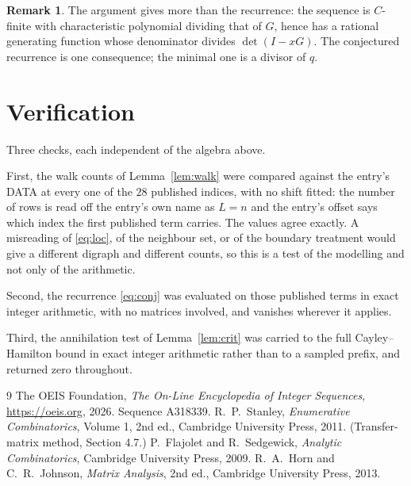 \documentclass[11pt,a4paper]{article}
\theoremstyle{plain}
\theoremstyle{definition}
\newtheorem{remark}[theorem]{Remark}
\begin{document}
\begin{remark}
The argument gives more than the recurrence: the sequence is $C$-finite with characteristic
polynomial dividing that of $G$, hence has a rational generating function whose denominator
divides $\det(I-xG)$. The conjectured recurrence is one consequence; the minimal one is a
divisor of $q$.
\end{remark}

\section{Verification}

Three checks, each independent of the algebra above.

First, the walk counts of Lemma~\ref{lem:walk} were compared against the entry's DATA at
every one of the $28$ published indices, with no shift fitted: the number of rows is
read off the entry's own name as $L=n$ and the entry's offset says which index the first
published term carries. The values agree exactly. A misreading of \eqref{eq:loc}, of the
neighbour set, or of the boundary treatment would give a different digraph and different
counts, so this is a test of the modelling and not only of the arithmetic.

Second, the recurrence \eqref{eq:conj} was evaluated on those published terms in exact
integer arithmetic, with no matrices involved, and vanishes wherever it applies.

Third, the annihilation test of Lemma~\ref{lem:crit} was carried to the full
Cayley--Hamilton bound in exact integer arithmetic rather than to a sampled prefix, and
returned zero throughout.

\begin{thebibliography}{9}
 The OEIS Foundation, \emph{The On-Line Encyclopedia of Integer
Sequences}, \url{https://oeis.org}, 2026. Sequence A318339.
 R.~P.~Stanley, \emph{Enumerative Combinatorics}, Volume 1, 2nd ed.,
Cambridge University Press, 2011. (Transfer-matrix method, Section 4.7.)
 P.~Flajolet and R.~Sedgewick, \emph{Analytic Combinatorics}, Cambridge
University Press, 2009.
 R.~A.~Horn and C.~R.~Johnson, \emph{Matrix Analysis}, 2nd ed., Cambridge
University Press, 2013.
\end{thebibliography}
\end{document}

